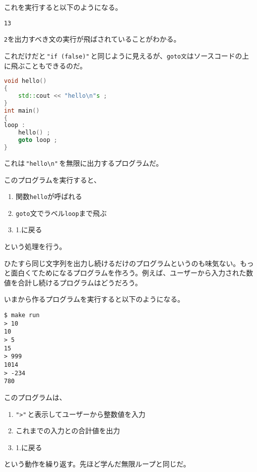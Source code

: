 これを実行すると以下のようになる。

\ifTombow\enlargethispage{3mm}\fi
\begin{lstlisting}[style=terminal]
13
\end{lstlisting}

\texttt{2}を出力すべき文の実行が飛ばされていることがわかる。

これだけだと\,\texttt{"if (false)"}\,と同じように見えるが、\texttt{goto文}はソースコードの上に飛ぶこともできるのだ。

\begin{lstlisting}[language={C++}]
void hello()
{
    std::cout << "hello\n"s ;
}
int main()
{
loop :
    hello() ;
    goto loop ; 
}
\end{lstlisting}

これは\,\texttt{"hello{\textbackslash}n"}\,を無限に出力するプログラムだ。

このプログラムを実行すると、
\begin{enumerate}
\def\labelenumi{\arabic{enumi}.}
\item
  関数\texttt{hello}が呼ばれる
\item
  \texttt{goto}文でラベル\texttt{loop}まで飛ぶ
\item
  1.に戻る
\end{enumerate}
という処理を行う。


ひたすら同じ文字列を出力し続けるだけのプログラムというのも味気ない。もっと面白くてためになるプログラムを作ろう。例えば、ユーザーから入力された数値を合計し続けるプログラムはどうだろう。

いまから作るプログラムを実行すると以下のようになる。

\begin{lstlisting}[style=terminal]
$ make run
> 10
10
> 5
15
> 999
1014
> -234
780
\end{lstlisting}

このプログラムは、
\begin{enumerate}
\def\labelenumi{\arabic{enumi}.}
\item
  \texttt{">"}\,と表示してユーザーから整数値を入力
\item
  これまでの入力との合計値を出力
\item
  1.に戻る
\end{enumerate}
という動作を繰り返す。先ほど学んだ無限ループと同じだ。

